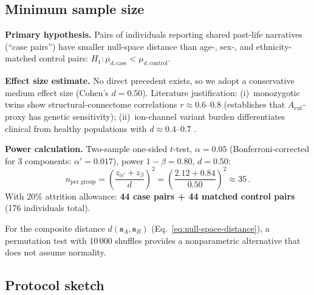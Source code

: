 \documentclass[aps,pre,twocolumn,superscriptaddress,floatfix]{revtex4-2}
\newcommand{\Acut}{A_{\text{cut}}}
\begin{document}
\subsection{Minimum sample size}
\label{app:sample-size}

\textbf{Primary hypothesis.}\;
Pairs of individuals reporting shared past-life narratives
(``case pairs'') have smaller null-space distance than
age-, sex-, and ethnicity-matched control pairs:
$H_1: \mu_{d,\text{case}} < \mu_{d,\text{control}}$.

\textbf{Effect size estimate.}\;
No direct precedent exists, so we adopt a conservative
medium effect size (Cohen's $d=0.50$).
Literature justification:
(i)~monozygotic twins show structural-connectome
correlations $r\approx 0.6$--$0.8$
\cite{Thompson2001,Kochunov2015} (establishes that
$\Acut$-proxy has genetic sensitivity);
(ii)~ion-channel variant burden differentiates
clinical from healthy populations with $d\approx 0.4$--$0.7$
\cite{Helbig2018}.

\textbf{Power calculation.}\;
Two-sample one-sided $t$-test,
$\alpha=0.05$ (Bonferroni-corrected for 3 components:
$\alpha'=0.017$), power $1-\beta=0.80$,
$d=0.50$:
\begin{equation}
  n_{\text{per group}}
  = \left(\frac{z_{\alpha'} + z_\beta}{d}\right)^{\!2}
  = \left(\frac{2.12+0.84}{0.50}\right)^{\!2}
  \approx 35\,.
  \label{eq:sample-size}
\end{equation}
With 20\% attrition allowance: \textbf{44 case pairs +
44 matched control pairs} (176 individuals total).

For the composite distance $d(\bm{s}_A,\bm{s}_B)$
(Eq.~\ref{eq:null-space-distance}), a permutation test
with 10\,000 shuffles provides a nonparametric alternative
that does not assume normality.

\subsection{Protocol sketch}
\label{app:protocol}
\end{document}
